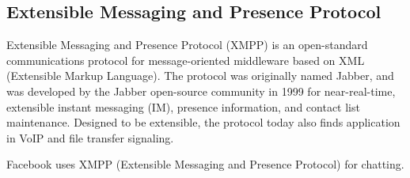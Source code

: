 \subsection{Extensible Messaging and Presence Protocol}
Extensible Messaging and Presence Protocol (XMPP) is an open-standard communications protocol for message-oriented middleware based on 
XML (Extensible Markup Language). The protocol was originally named Jabber, and was developed by the Jabber open-source community 
in 1999 for near-real-time, extensible instant messaging (IM), presence information, and contact list maintenance. Designed to 
be extensible, the protocol today also finds application in VoIP and file transfer signaling.\cite{wiki_xmpp}

Facebook uses XMPP (Extensible Messaging and Presence Protocol) for chatting.	

\newpage
